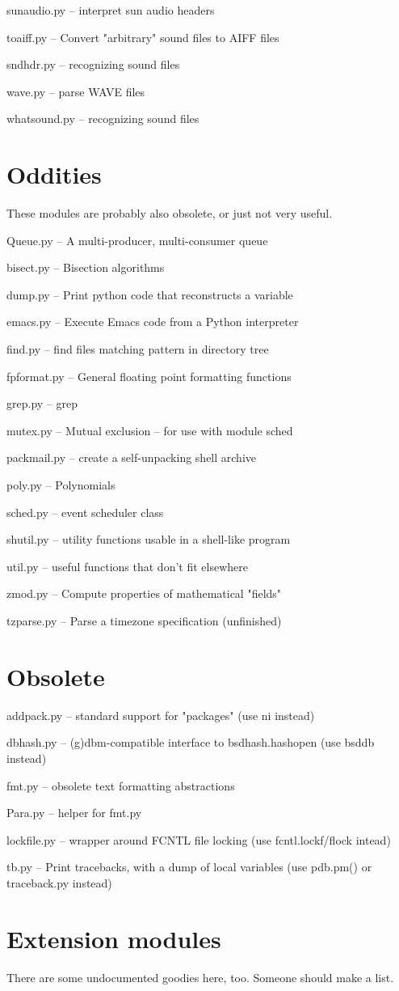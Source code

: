 sunaudio.py -- interpret sun audio headers

toaiff.py -- Convert "arbitrary" sound files to AIFF files

sndhdr.py -- recognizing sound files

wave.py -- parse WAVE files

whatsound.py -- recognizing sound files


\section{Oddities}

These modules are probably also obsolete, or just not very useful.

Queue.py -- A multi-producer, multi-consumer queue

bisect.py -- Bisection algorithms

dump.py -- Print python code that reconstructs a variable

emacs.py -- Execute Emacs code from a Python interpreter

find.py -- find files matching pattern in directory tree

fpformat.py -- General floating point formatting functions

grep.py -- grep

mutex.py -- Mutual exclusion -- for use with module sched

packmail.py -- create a self-unpacking shell archive

poly.py -- Polynomials

sched.py -- event scheduler class

shutil.py -- utility functions usable in a shell-like program

util.py -- useful functions that don't fit elsewhere

zmod.py -- Compute properties of mathematical "fields"

tzparse.py -- Parse a timezone specification (unfinished)


\section{Obsolete}

addpack.py -- standard support for "packages" (use ni instead)

dbhash.py -- (g)dbm-compatible interface to bsdhash.hashopen (use
bsddb instead)

fmt.py -- obsolete text formatting abstractions

Para.py -- helper for fmt.py

lockfile.py -- wrapper around FCNTL file locking (use
fcntl.lockf/flock intead)

tb.py -- Print tracebacks, with a dump of local variables (use
pdb.pm() or traceback.py instead)


\section{Extension modules}

There are some undocumented goodies here, too.  Someone should make a
list.
